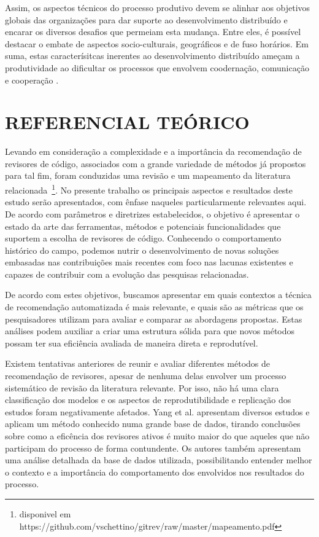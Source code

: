 \documentclass[12pt,openany,oneside,a4paper,english,brazil]{abntbibufjf}
\begin{document}
  Assim, os aspectos técnicos do processo produtivo devem se alinhar aos objetivos globais das organizações para dar suporte ao desenvolvimento distribuído e encarar os diversos desafios que permeiam esta mudança. Entre eles, é possível destacar o embate de aspectos socio-culturais, geográficos e de fuso horários. Em suma, estas caracterísitcas inerentes ao desenvolvimento distribuído ameçam a produtividade ao dificultar os processos que envolvem coodernação, comunicação e cooperação \cite{carmel2001}.

\chapter{REFERENCIAL TEÓRICO}\label{chap:trabalhos_relacionados}

Levando em consideração a complexidade e a importância da recomendação de revisores de código, associados com a grande variedade de métodos já propostos para tal fim, foram conduzidas uma revisão e um mapeamento da literatura relacionada~\cite{schettino2019b}\footnote{disponivel em https://github.com/vschettino/gitrev/raw/master/mapeamento.pdf}. No presente trabalho os principais aspectos e resultados deste estudo serão apresentados, com ênfase naqueles particularmente relevantes aqui. De acordo com parâmetros e diretrizes estabelecidos, \cite{kitchenham2004} o objetivo é apresentar o estado da arte das ferramentas, métodos e potenciais funcionalidades que suportem a escolha de revisores de código. Conhecendo o comportamento histórico do campo, podemos nutrir o desenvolvimento de novas soluções embasadas nas contribuições mais recentes com foco nas lacunas existentes e capazes de contribuir com a evolução das pesquisas relacionadas.

De acordo com estes objetivos, buscamos apresentar em quais contextos a técnica de recomendação automatizada é mais relevante, e quais são as métricas que os pesquisadores utilizam para avaliar e comparar as abordagens propostas. Estas análises podem auxiliar a criar uma estrutura sólida para que novos métodos possam ter sua eficiência avaliada de maneira direta e reprodutível.

Existem tentativas anteriores de reunir e avaliar diferentes métodos de recomendação de revisores, apesar de nenhuma delas envolver um processo sistemático de revisão da literatura relevante. Por isso, não há uma clara classificação dos modelos e os aspectos de reprodutibilidade e replicação dos estudos foram negativamente afetados. Yang et al. \cite{yang2017} apresentam diversos estudos e aplicam um método conhecido numa grande base de dados, tirando conclusões sobre como a eficência dos revisores ativos é muito maior do que aqueles que não participam do processo de forma contundente. Os autores também apresentam uma análise detalhada da base de dados utilizada, possibilitando entender melhor o contexto e a importância do comportamento dos envolvidos nos resultados do processo.
\end{document}

